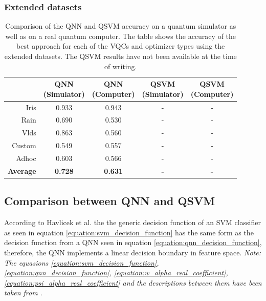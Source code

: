 \subsubsection{Extended datasets}
\label{subsubsection:extended_datasets_comparison}
\begin{table}[!h]
	\centering
	\begin{tabular}{r|cc|cc}
		\hline 
		\thead{Dataset} & \thead{QNN\\(Simulator)} & \thead{QNN\\(Computer)} & \thead{QSVM\\(Simulator)} & \thead{QSVM\\(Computer)} \\
		\hline 
		Iris    & 0.933 & 0.943 & -  & - \\
		Rain    & 0.690 & 0.530 & -  & - \\
		Vlds    & 0.863 & 0.560 & -  & - \\
		Custom  & 0.549 & 0.557 & -  & - \\
		Adhoc   & 0.603 & 0.566 & -  & - \\
		\hline
		\textbf{Average}  & \textbf{0.728} & \textbf{0.631} & \textbf{-} & \textbf{-}  \\
		\hline
	\end{tabular}
	\caption{Comparison of the QNN and QSVM accuracy on a quantum simulator as well as on a real quantum computer. The table shows the accuracy of the best approach for each of the VQCs and optimizer types using the extended datasets. The QSVM results have not been available at the time of writing.}
	\label{table:comparison_extended_datasets_accuracy}
\end{table}

\clearpage

\subsection{Comparison between QNN and QSVM}
According to Havlicek et al. the the generic decision function of an SVM classifier as seen in equation \ref{equation:svm_decision_function} has the same form as the decision function from a QNN seen in equation \ref{equation:qnn_decision_function}, therefore, the QNN implements a linear decision boundary in feature space\cite{havlicekSupervisedLearningQuantum2019}. \textit{Note: The equasions \ref{equation:svm_decision_function}, \ref{equation:qnn_decision_function}, \ref{equation:w_alpha_real_coefficient}, \ref{equation:psi_alpha_real_coefficient} and the descriptions between them have been taken from \cite{ThomsenComparingQNNs_QSVM}}.

